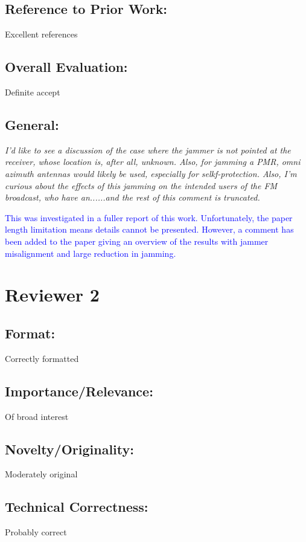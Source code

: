 \documentclass[11pt]{amsart}
\begin{document}
\subsection{Reference to Prior Work:}
 Excellent references

\subsection{Overall Evaluation:}
 Definite accept

\subsection{General:}

\emph{I'd like to see a discussion of the case where the jammer is not pointed at the receiver, whose location is, after all, unknown. Also, for jamming a PMR, omni azimuth antennas would likely be used, especially for selkf-protection.  Also, I'm curious about the effects of this jamming on the intended users of the FM broadcast, who have an......and the rest of this comment is truncated.}

\textcolor{blue}{
This was investigated in a fuller report of this work. Unfortunately, the paper length limitation means details cannot be presented. However, a comment has been added to the paper giving an overview of the results with jammer misalignment and large reduction in jamming.
}

\section{Reviewer 2}

\subsection{Format:}
 Correctly formatted

\subsection{Importance/Relevance: }

Of broad interest

\subsection{Novelty/Originality:}

 Moderately original

\subsection{Technical Correctness:}
 Probably correct
\end{document}
